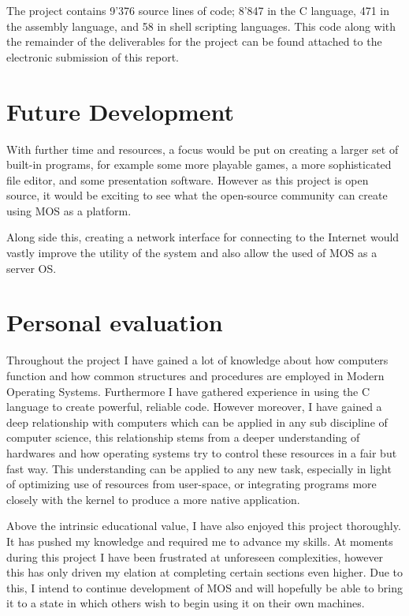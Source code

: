 \documentclass[a4paper]{report}
\begin{document}
The project contains 9'376 source lines of code; 8'847 in the C language, 471 in the assembly language, and 58 in shell scripting languages. This code along with the remainder of the deliverables for the project can be found attached to the electronic submission of this report.

\section{Future Development}

With further time and resources, a focus would be put on creating a larger set of built-in programs, for example some more playable games, a more sophisticated file editor, and some presentation software. However as this project is open source, it would be exciting to see what the open-source community can create using MOS as a platform.

Along side this, creating a network interface for connecting to the Internet would vastly improve the utility of the system and also allow the used of MOS as a server OS.


\section{Personal evaluation}

Throughout the project I have gained a lot of knowledge about how computers function and how common structures and procedures are employed in Modern Operating Systems. Furthermore I have gathered experience in using the C language to create powerful, reliable code. However moreover, I have gained a deep relationship with computers which can be applied in any sub discipline of computer science, this relationship stems from a deeper understanding of hardwares and how operating systems try to control these resources in a fair but fast way. This understanding can be applied to any new task, especially in light of optimizing use of resources from user-space, or integrating programs more closely with the kernel to produce a more native application.

Above the intrinsic educational value, I have also enjoyed this project thoroughly. It has pushed my knowledge and required me to advance my skills. At moments during this project I have been frustrated at unforeseen complexities, however this has only driven my elation at completing certain sections even higher. Due to this, I intend to continue development of MOS and will hopefully be able to bring it to a state in which others wish to begin using it on their own machines.
\end{document}
